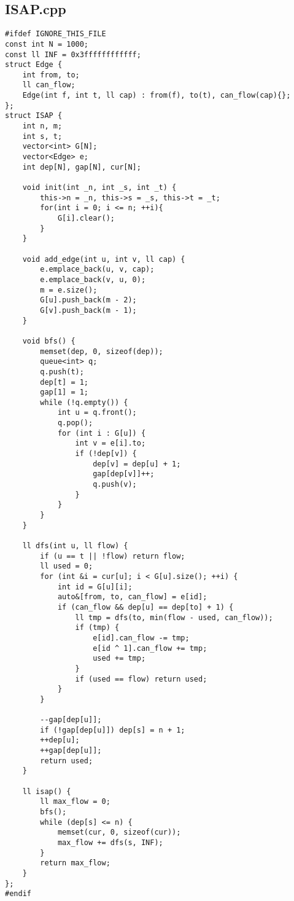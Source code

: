 \documentclass[UTF8, a4paper, titlepage, twoside]{ctexart}
\begin{document}
\subsection{ISAP.cpp}
\begin{verbatim}
#ifdef IGNORE_THIS_FILE
const int N = 1000;
const ll INF = 0x3ffffffffffff;
struct Edge {
    int from, to;
    ll can_flow;
    Edge(int f, int t, ll cap) : from(f), to(t), can_flow(cap){};
};
struct ISAP {
    int n, m; 
    int s, t; 
    vector<int> G[N]; 
    vector<Edge> e; 
    int dep[N], gap[N], cur[N];

    void init(int _n, int _s, int _t) {
        this->n = _n, this->s = _s, this->t = _t;
        for(int i = 0; i <= n; ++i){
            G[i].clear();
        }
    }

    void add_edge(int u, int v, ll cap) {
        e.emplace_back(u, v, cap);
        e.emplace_back(v, u, 0);
        m = e.size();
        G[u].push_back(m - 2);
        G[v].push_back(m - 1);
    }

    void bfs() {
        memset(dep, 0, sizeof(dep));
        queue<int> q;
        q.push(t);
        dep[t] = 1;
        gap[1] = 1;
        while (!q.empty()) {
            int u = q.front();
            q.pop();
            for (int i : G[u]) {
                int v = e[i].to;
                if (!dep[v]) {
                    dep[v] = dep[u] + 1;
                    gap[dep[v]]++;
                    q.push(v);
                }
            }
        }
    }

    ll dfs(int u, ll flow) {
        if (u == t || !flow) return flow;
        ll used = 0;
        for (int &i = cur[u]; i < G[u].size(); ++i) {
            int id = G[u][i];
            auto&[from, to, can_flow] = e[id];
            if (can_flow && dep[u] == dep[to] + 1) {
                ll tmp = dfs(to, min(flow - used, can_flow));
                if (tmp) {
                    e[id].can_flow -= tmp;
                    e[id ^ 1].can_flow += tmp;
                    used += tmp;
                }
                if (used == flow) return used;
            }
        }
        
        --gap[dep[u]];
        if (!gap[dep[u]]) dep[s] = n + 1;
        ++dep[u];
        ++gap[dep[u]];
        return used;
    }

    ll isap() {
        ll max_flow = 0;
        bfs();
        while (dep[s] <= n) {
            memset(cur, 0, sizeof(cur));
            max_flow += dfs(s, INF);
        }
        return max_flow;
    }
};
#endif
\end{verbatim}
\end{document}
